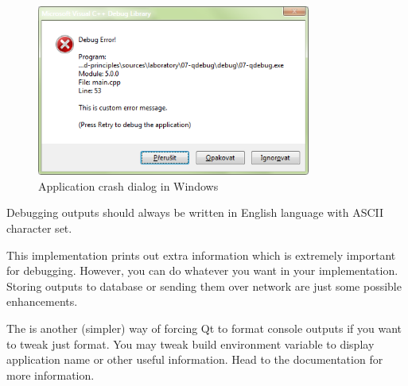 \begin{figure}[ht]
\centering\includegraphics[width=9cm]{graphics/laboratory/11-debugdialog.png}
\caption{Application crash dialog in Windows}\label{figure:errordialog}
\end{figure}

\begin{fdocextra}
Debugging outputs should always be written in English language with ASCII character set.
\end{fdocextra}

This implementation prints out extra information which is extremely important for debugging. However, you can do whatever you want in your implementation. Storing outputs to database or sending them over network are just some possible enhancements.

The is another (simpler) way of forcing Qt to format console outputs if you want to tweak just format. You may tweak build environment variable to display application name or other useful information. Head to the documentation \citep{various:qtdoc} for more information.
%
